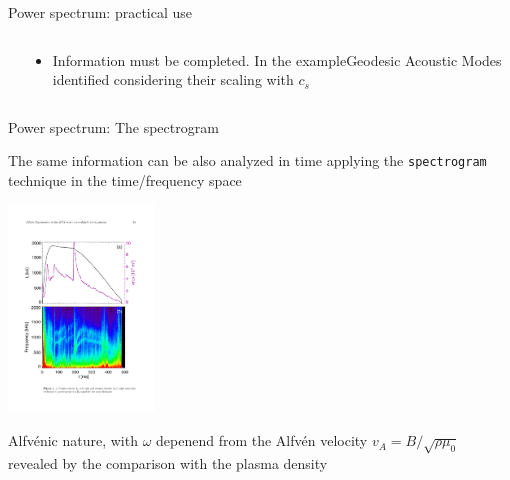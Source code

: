 \documentclass[t,10pt]{beamer}
\begin{document}
\begin{frame}{Power spectrum: practical use}
{\begin{columns}[c]
\begin{column}{0.6\textwidth}
\end{column}
\begin{column}{0.4\textwidth}
{\small \begin{itemize}
\item Information must be completed. In the
  example\textcolor{taskyblue}{Geodesic Acoustic Modes} identified
  considering their scaling with $c_s$
\end{itemize}}
\end{column}
\end{columns}
}\end{frame}

\begin{frame}{Power spectrum: The spectrogram}
\begin{itemize}
{\footnotesize \item The same information can be also analyzed in time applying the
  \textcolor{tascarletred}{\texttt{spectrogram}} technique in the time/frequency
  space {\footnotesize \parencite{spagnolo}}
}

\begin{center}
\includegraphics[height=5.5cm]{alfven} 
\end{center}
{\footnotesize\item Alfv\'enic nature, with $\omega$ depenend from the
  Alfv\'en velocity $v_A = B/\sqrt{\rho\mu_0}$ revealed by the
  comparison with the plasma density
}\end{itemize}
\end{frame}
\end{document}
